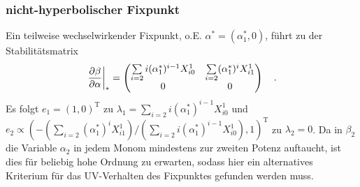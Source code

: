     \subsubsection{nicht-hyperbolischer Fixpunkt}\label{beta_im_R2:nicht-hyperbolischer_Fixpunkt}
	 Ein teilweise wechselwirkender Fixpunkt, o.E. $\alpha^*=(\alpha_1^*,0)$,  
	 führt zu der Stabilitätsmatrix 
	 \begin{equation}
	 \left.\frac{\partial \beta}{\partial \alpha}\right|_* = \begin{pmatrix}
	          \sum\limits_{i=2}i (\alpha_1^*)^{i-1}  X^1_{i0} &
	          \sum\limits_{i=2} (\alpha_1^*)^i  X^1_{i1}\\
	          0&
	          0
	         \end{pmatrix} \quad . \label{eq:beta_im_R2:stab_matrix_0}
	 \end{equation}
	 Es folgt $e_1=(1,0)^\text{T}$ zu $\lambda_1 = \sum_{i=2}i 
	 (\alpha_1^*)^{i-1}  X^1_{i0}$ und $e_2\propto(-(\sum_{i=2} (\alpha_1^*)^i  
	 X^1_{i1} )/(\sum_{i=2}i (\alpha_1^*)^{i-1}  X^1_{i0}) ,1)^\text{T}$ 
	 zu $\lambda_2=0$. Da in $\beta_2$ die Variable $\alpha_2$ in jedem Monom  
	 mindestens zur zweiten Potenz auftaucht, ist dies für 
	 beliebig hohe Ordnung zu erwarten, sodass hier ein alternatives Kriterium 
	 für das UV-Verhalten des Fixpunktes gefunden werden muss.  



